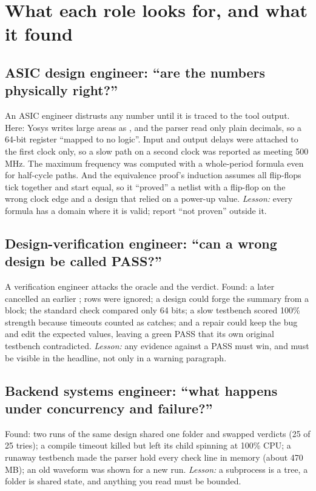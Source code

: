 \section{What each role looks for, and what it found}

\subsection*{ASIC design engineer: ``are the numbers physically right?''}
An ASIC engineer distrusts any number until it is traced to the tool output. Here: Yosys writes large areas as , and the parser read only plain decimals, so a 64-bit register ``mapped to no logic''. Input and output delays were attached to the first clock only, so a slow path on a second clock was reported as meeting 500 MHz. The maximum frequency was computed with a whole-period formula even for half-cycle paths. And the equivalence proof's induction assumes all flip-flops tick together and start equal, so it ``proved'' a netlist with a flip-flop on the wrong clock edge and a design that relied on a power-up value. \emph{Lesson:} every formula has a domain where it is valid; report ``not proven'' outside it.

\subsection*{Design-verification engineer: ``can a wrong design be called PASS?''}
A verification engineer attacks the oracle and the verdict. Found: a later  cancelled an earlier ;  rows were ignored; a design could forge the summary from a  block; the standard check compared only 64 bits; a slow testbench scored 100\% strength because timeouts counted as catches; and a repair could keep the bug and edit the expected values, leaving a green PASS that its own original testbench contradicted. \emph{Lesson:} any evidence against a PASS must win, and must be visible in the headline, not only in a warning paragraph.

\subsection*{Backend systems engineer: ``what happens under concurrency and failure?''}
Found: two runs of the same design shared one folder and swapped verdicts (25 of 25 tries); a compile timeout killed  but left its child  spinning at 100\% CPU; a runaway testbench made the parser hold every check line in memory (about 470 MB); an old waveform was shown for a new run. \emph{Lesson:} a subprocess is a tree, a folder is shared state, and anything you read must be bounded.

